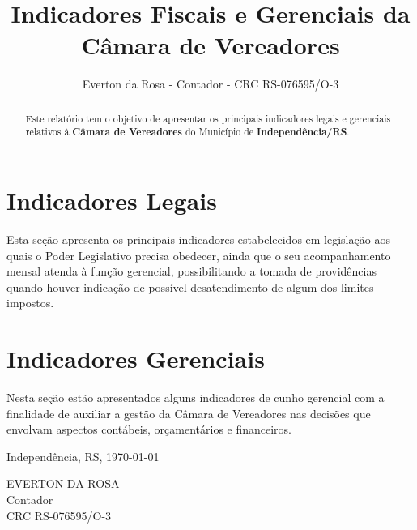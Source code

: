 \documentclass[12pt, a4paper]{article}
\title{Indicadores Fiscais e Gerenciais da Câmara de Vereadores}
\author{Everton da Rosa - Contador - CRC RS-076595/O-3}
\begin{document}
\maketitle

\begin{abstract}
Este relatório tem o objetivo de apresentar os principais indicadores legais e gerenciais relativos à \textbf{Câmara de Vereadores} do Município de \textbf{Independência/RS}.
\end{abstract}

\tableofcontents

\section{Indicadores Legais}

Esta seção apresenta os principais indicadores estabelecidos em legislação aos quais o Poder Legislativo precisa obedecer, ainda que o seu acompanhamento mensal atenda à função gerencial, possibilitando a tomada de providências quando houver indicação de possível desatendimento de algum dos limites impostos.







\section{Indicadores Gerenciais}

Nesta seção estão apresentados alguns indicadores de cunho gerencial com a finalidade de auxiliar a gestão da Câmara de Vereadores nas decisões que envolvam aspectos contábeis, orçamentários e financeiros.




\vspace{16pt}

\begin{center}
	Independência, RS, \today
\end{center}

\vspace{36pt}

\begin{center}
	EVERTON DA ROSA\\
	Contador\\
	CRC RS-076595/O-3
\end{center}
\end{document}
